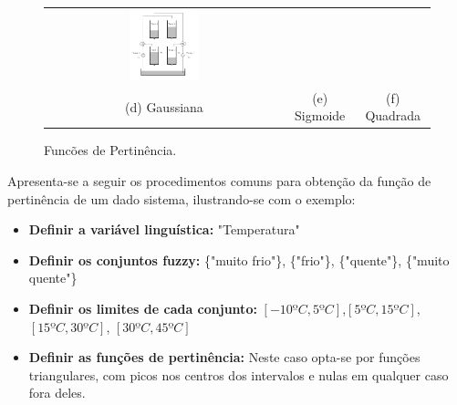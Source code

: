 \begin{figure}[H]
\begin{tabular}{ccc}
	\includegraphics[width=0.3\textwidth,keepaspectratio]{img/4tank.png} \\
	(d) Gaussiana &
	(e) Sigmoide &
	(f) Quadrada
\end{tabular}
	\caption{\label{figPert}Funcões de Pertinência.}
\end{figure}

Apresenta-se a seguir os procedimentos comuns para obtenção da função de pertinência de um dado sistema, ilustrando-se com o exemplo:
\begin{itemize}
	\item \textbf{Definir a variável linguística:} "Temperatura"
	\item \textbf{Definir os conjuntos fuzzy:} \{"muito frio"\}, \{"frio"\}, \{"quente"\}, \{"muito quente"\}
	\item \textbf{Definir os limites de cada conjunto:} $[-10ºC,5ºC]$,$ [5ºC,15ºC]$, $[15ºC,30ºC]$, $[30ºC,45ºC]$ 
	\item \textbf{Definir as funções de pertinência:} Neste caso opta-se por funções triangulares, com picos nos centros dos intervalos e nulas em qualquer caso fora deles.
\end{itemize}


